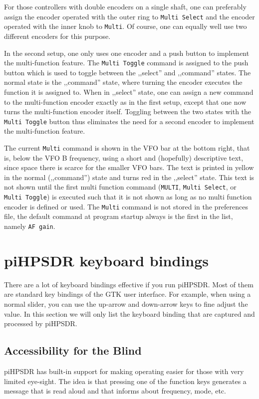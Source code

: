 \documentclass[12pt]{book}
\def\bltt#1{\texttt{\color{blue}#1}}
\def\pH{pi\-HPSDR\xspace}
\begin{document}
For those controllers with double encoders on a single shaft, one can preferably assign the encoder
operated with the outer ring  to \bltt{Multi Select} and the encoder operated with the inner
knob to \bltt{Multi}. Of course, one can equally well use two different encoders for this purpose.

In the second setup, one only uses one encoder and a push button to implement the multi-function
feature. The \bltt{Multi Toggle} command is assigned to the push button which is used to toggle
between the ,,select'' and ,,command'' states. The normal state is the ,,command'' state, where
turning the encoder executes the function it is assigned to. When in ,,select'' state, one can
assign a new command to the multi-function encoder exactly as in the first setup, except that
one now turns the multi-function encoder itself. Toggling between the
two states with the \bltt{Multi Toggle} button
thus eliminates the need for a second encoder to implement the multi-function feature.

The current \bltt{Multi} command is shown in the VFO bar at the bottom right, that is, below
the VFO B frequency, using a short and (hopefully) descriptive text, since space there is
scarce for the smaller VFO bars. The text is printed in yellow in the normal (,,command'') state and
turns red in the ,,select'' state. This text is not shown until the first multi function command
(\bltt{MULTI}, \bltt{Multi Select}, or \bltt{Multi Toggle}) is executed such that it is not
shown as long as no multi function encoder is defined or used. The \bltt{Multi} command is not
stored in the preferences file, the default command at program startup always is the first in the list,
namely \bltt{AF gain}.
\chapter[Keyboard bindings]{\pH keyboard bindings}

There are a lot of keyboard bindings effective if you run \pH. Most of them are
standard key bindings of the GTK user interface. For example, when using a normal
slider, you can use the up-arrow and down-arrow keys to fine adjust the value. In this
section we will only list the keyboard binding that are captured and processed by \pH.

\section{Accessibility for the Blind}
\label{sec:accessibility}
\pH has built-in support for making operating easier for those with very limited
eye-sight. The idea is that pressing one of the function keys generates a message that
is read aloud and that informs about frequency, mode, etc.
\end{document}
